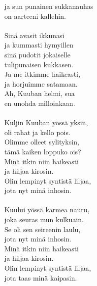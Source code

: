         ja sun punainen sukkanauhas \\
        on aarteeni kallehin. \\
\hspace{10mm} \\
        Sinä avasit ikkunasi \\
        ja kummasti hymyillen \\
        sinä pudotit jokaiselle \\
        tulipunaisen kukkasen. \\
        Ja me itkimme haikeasti, \\
        ja horjuimme satamaan. \\
        Ah, Kuuban helmi, sua \\
        en unohda milloinkaan. \\
\hspace{10mm} \\
        Kuljin Kuuban yössä yksin, \\
        oli rahat ja kello pois. \\
        Olimme olleet sylityksin, \\
        tämä kaiken loppuko ois? \\
        Minä itkin niin haikeasti \\
        ja hiljaa kirosin. \\
        Olin lempinyt syntistä liljaa, \\
        jota nyt minä inhosin. \\
\hspace{10mm} \\
        Kuului yössä karmea nauru, \\
        joka seuras mun kulkuain. \\
        Se oli sen seireenin laulu, \\
        jota nyt minä inhosin. \\
        Minä itkin niin haikeasti \\
        ja hiljaa kirosin. \\
        Olin lempinyt syntistä liljaa, \\
        jota taas minä kaipasin. \\
